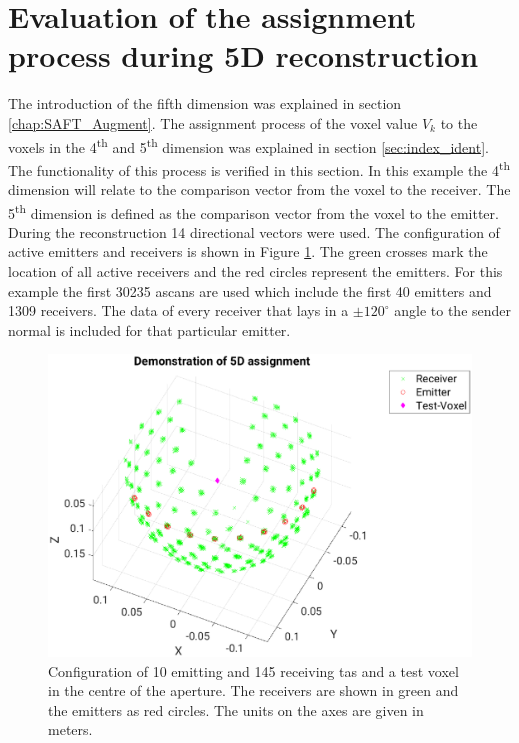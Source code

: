 \newpage

\section{Evaluation of the assignment process during 5D reconstruction}
The introduction of the fifth dimension was explained in section \ref{chap:SAFT_Augment}. The assignment process of the  voxel value $V_k$ to the voxels in the 4\textsuperscript{th} and 5\textsuperscript{th} dimension was explained in section \ref{sec:index_ident}. The functionality of this process is verified in this section. In this example the 4\textsuperscript{th} dimension will relate to the comparison vector from the voxel to the receiver. The 5\textsuperscript{th} dimension is defined as the comparison vector from the voxel to the emitter. During the reconstruction 14 directional vectors were used. 
The configuration of active emitters and receivers is shown in Figure \ref{fig:res:5th_dim_over_4th_aperture}. The green crosses mark the location of all active receivers and the red circles represent the emitters. For this example the first 30235 \acp{ascan} are used which include the first 40 emitters and 1309 receivers. The data of every receiver that lays in a $\pm 120^{\circ}$ angle to the sender normal is included for that particular emitter.

\begin{figure}[H]
    \centering
    \includegraphics[width=0.89\linewidth]{Graphics/Results/4d_5d/5thDim_over_4thDim_150_150_150_apertur.eps}
    \caption{Configuration of 10 emitting and 145 receiving \ac{tas} and a test voxel in the centre of the aperture. The receivers are shown in green and the emitters as red circles. The units on the axes are given in meters. }
    \label{fig:res:5th_dim_over_4th_aperture}
\end{figure}

